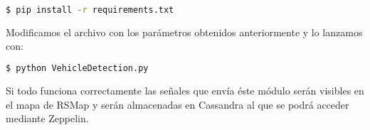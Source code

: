 \begin{lstlisting}[language=bash,caption={Instalar depenencias},label={lst:pi1}]
$ pip install -r requirements.txt
\end{lstlisting}

Modificamos el archivo con los parámetros obtenidos anteriormente y lo lanzamos con:

\begin{lstlisting}[language=bash,caption={Ejecución de VehicleDetection.py},label={lst:pi1}]
$ python VehicleDetection.py
\end{lstlisting}

Si todo funciona correctamente las señales que envía éste módulo serán visibles en el mapa de RSMap y serán almacenadas en Cassandra al que se podrá acceder mediante Zeppelin.
